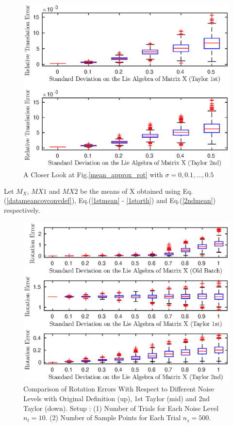\documentclass[twocolumn,10pt]{asme2ej}
\begin{document}
\begin{figure}[h]\label{mean_approx_rot_close}
\includegraphics[scale = 0.60]{Mean_Definition_Figures/mean_trans_rel_5.eps}
\caption{A Closer Look at Fig.\ref{mean_approx_rot} with $\sigma = 0, 0.1, ... , 0.5$}
\centering
\end{figure}

Let $M_X$, $MX1$ and $MX2$ be the means of X obtained using Eq.(\ref{datameancovconvdef}), Eq.(\ref{1stmean} - \ref{1storth}) and Eq.(\ref{2ndmean}) respectively.  
\begin{figure}[h]
\includegraphics[scale = 0.60]{Mean_Definition_Figures/mean_rot_abs_10.eps}
\caption{Comparison of Rotation Errors With Respect to Different Noise Levels with Original Definition (up), 1st Taylor (mid) and 2nd Taylor (down). Setup : (1) Number of Trials for Each Noise Level $n_t = 10$. (2) Number of Sample Points for Each Trial $n_s = 500$. }
\centering
\label{mean_comp_tran}
\end{figure}
\end{document}
